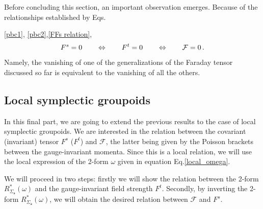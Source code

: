 \documentclass[12pt,a4paper]{article}
\numberwithin{equation}{section}
\theoremstyle{definition}
\newcommand{\sfa}{\mathsf{a}}
\newcommand{\eqn}{\eqref}
\begin{document}
Before concluding this section, an important observation emerges. Because of the relationships established by Eqs. {\eqn{pbc1}, \eqn{pbc2},\eqn{FFs relation},  
\begin{equation}\label{FsFcal}
F^s=0\qquad \Leftrightarrow \qquad F^t=0\qquad \Leftrightarrow \qquad{\cal F}=0\,.
\end{equation}
Namely, the vanishing of one of the generalizations of the {Faraday} tensor discussed so far is equivalent to the vanishing of all the others. 


\subsection{Local symplectic groupoids}\label{locsympg}

In this final part, we are going to extend the previous results to the case of local symplectic groupoids. We are interested in the relation between the covariant (invariant) tensor $F^s$ ($F^t$) and $\mathcal{F}$, the latter being given by  the Poisson brackets between the gauge-invariant momenta.
Since this  is a local relation, we will use the local expression of the 2-form $\omega$ given in equation Eq.\eqref{local_omega}.


We will proceed in two steps: firstly we will show the relation between the 2-form $R_{\Sigma_{\sfa}}^*(\omega)$ and the gauge-invariant field strength $F^t$. Secondly, by inverting the 2-form $R_{\Sigma_{\sfa}}^*(\omega)$, we will obtain the desired relation between $\mathcal{F}$ and $F^s$.

}
\end{document}
